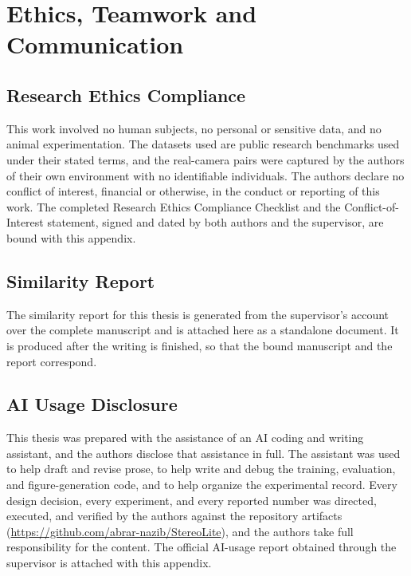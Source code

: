 \chapter{Ethics, Teamwork and Communication}

\section{Research Ethics Compliance}
This work involved no human subjects, no personal or sensitive data, and
no animal experimentation. The datasets used are public research
benchmarks used under their stated terms, and the real-camera pairs were
captured by the authors of their own environment with no identifiable
individuals. The authors declare no conflict of interest, financial or
otherwise, in the conduct or reporting of this work. The completed
Research Ethics Compliance Checklist and the Conflict-of-Interest
statement, signed and dated by both authors and the supervisor, are bound
with this appendix.

\section{Similarity Report}
The similarity report for this thesis is generated from the supervisor's
account over the complete manuscript and is attached here as a standalone
document. It is produced after the writing is finished, so that the bound
manuscript and the report correspond.

\section{AI Usage Disclosure}
This thesis was prepared with the assistance of an AI coding and writing
assistant, and the authors disclose that assistance in full. The
assistant was used to help draft and revise prose, to help write and
debug the training, evaluation, and figure-generation code, and to help
organize the experimental record. Every design decision, every experiment,
and every reported number was directed, executed, and verified by the
authors against the repository artifacts
(\url{https://github.com/abrar-nazib/StereoLite}), and the authors take
full responsibility for the content. The official AI-usage report obtained
through the supervisor is attached with this appendix.

